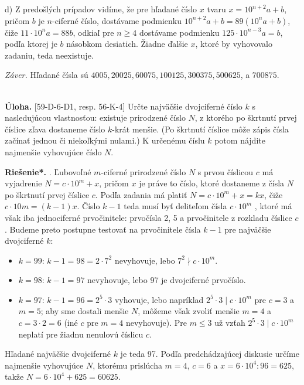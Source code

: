 \documentclass[11pt,a4paper,oneside,final]{book}
\newcommand{\ul}{\textbf{Úloha.} }
\newcommand{\rieh}{\textbf{Riešenie*.} }
\begin{document}
d) Z predošlých prípadov vidíme, že pre hľadané číslo $x$ tvaru $x = 10^{n+2} a + b$, pričom $b$ je $n$-ciferné číslo, dostávame podmienku $10^{n+2} a + b = 89(10^n a + b)$, čiže $11 \cdot 10^n a = 88b$, odkiaľ pre $n \geq 4$ dostávame podmienku $125 \cdot 10^{n-3} a = b$, podľa ktorej je $b$ násobkom desiatich. Žiadne ďalšie $x$, ktoré by vyhovovalo zadaniu, teda neexistuje.

\textit{Záver.} Hľadané čísla sú $4 005, 20 025, 60 075, 100 125, 300 375, 500 625$, a $700 875$.\\
\\
\begin{tcolorbox}[breakable,notitle,boxrule=0pt,colback=light-gray,colframe=light-gray]\ul [59-D-6-D1, resp. 56-K-4] Určte najväčšie dvojciferné číslo $k$ s nasledujúcou vlastnosťou: existuje prirodzené číslo $N$, z ktorého po škrtnutí prvej číslice zľava dostaneme číslo $k$-krát menšie. (Po škrtnutí číslice môže zápis čísla začínať jednou či niekoľkými nulami.) K určenému číslu $k$ potom nájdite najmenšie vyhovujúce číslo $N$.

\end{tcolorbox}

\rieh . Ľubovoľné $m$-ciferné prirodzené číslo $N$ s prvou číslicou $c$ má vyjadrenie $N = c \cdot 10^m + x$, pričom $x$ je práve to číslo, ktoré dostaneme z čísla $N$ po škrtnutí prvej číslice $c$. Podľa zadania má platiť $N = c \cdot 10^m + x = kx$, čiže $c \cdot 10 m = (k - 1)x$. Číslo $k - 1$ teda musí byť deliteľom čísla $c \cdot 10^m$ , ktoré má však iba jednociferné prvočinitele: prvočísla 2, 5 a prvočinitele z rozkladu číslice $c$. Budeme preto postupne testovať na prvočinitele čísla $k - 1$ pre najväčšie dvojciferné $k$:
\begin{itemize}
\item  $k = 99$: $k - 1 = 98 = 2 \cdot 7^2$ nevyhovuje, lebo $7^2 \nmid c \cdot 10^m$.
\item  $k = 98$: $k - 1 = 97$ nevyhovuje, lebo 97 je dvojciferné prvočíslo.
\item $k = 97$: $k-1 = 96 = 2^5 \cdot3$ vyhovuje, lebo napríklad $2^5 \cdot3 \mid c\cdot10^m$ pre $c = 3$ a $m = 5$; aby sme dostali menšie $N$, môžeme však zvoliť menšie $m = 4$ a $c = 3 \cdot 2 = 6$ (iné $c$ pre $m = 4$ nevyhovuje). Pre $m \leq 3$ už vzťah $2^5 \cdot 3 \mid c \cdot 10^m$ neplatí pre žiadnu
nenulovú číslicu $c$.
\end{itemize}

Hľadané najväčšie dvojciferné $k$ je teda 97. Podľa predchádzajúcej diskusie určíme najmenšie vyhovujúce $N$, ktorému prislúcha $m = 4$, $c = 6$ a $x = 6 \cdot 10^4 : 96 = 625$, takže $N = 6 \cdot 10^4 + 625 = 60 625$.
\end{document}
